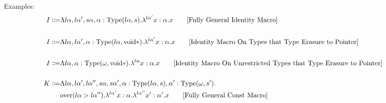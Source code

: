\documentclass {article}
\begin{document}
Examples:
\begin{align*}
I \Coloneqq & \Lambda l \alpha, l \alpha', s \alpha, \alpha : \text{Type} (l \alpha,s). \lambda^{l \alpha '} x : \alpha. x \tag* {[Fully General Identity Macro]} \\
\\
I \Coloneqq & \Lambda l \alpha, l \alpha', \alpha : \text{Type} (l \alpha,\text{void}*). \lambda^{l \alpha '} x : \alpha. x \tag* {[Identity Macro On Types that Type Erasure to Pointer]} \\
\\
I \Coloneqq & \Lambda l \alpha, \alpha : \text{Type} (\omega,\text{void}*). \lambda^{l \alpha} x : \alpha. x \tag* {[Identity Macro On Unrestricted Types that Type Erasure to Pointer]} \\
\\ 
K \Coloneqq & \Lambda l \alpha, l \alpha', l \alpha'', s \alpha, s \alpha', \alpha : \text{Type} (l \alpha, s), \alpha' : \text{Type} (\omega, s'). \\
& \text{over} (l \alpha > l \alpha''). \lambda^{l\alpha'} x : \alpha. \lambda^{l \alpha''} x' : \alpha'. x \tag* {[Fully General Const Macro]}
\end{align*}
\end{document}
